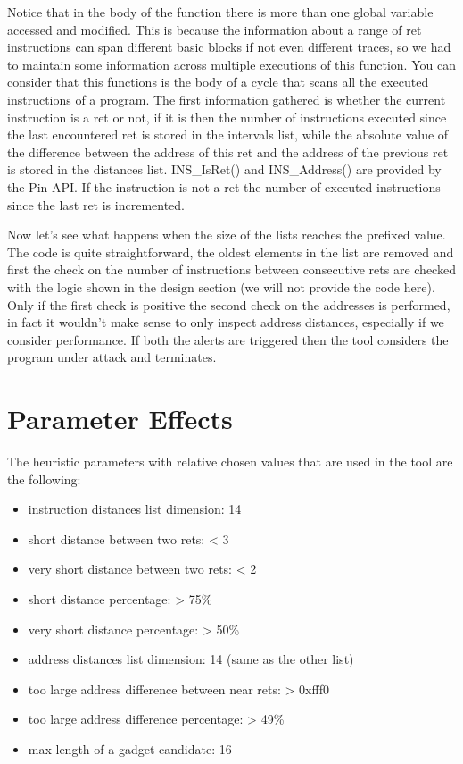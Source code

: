 \documentclass[Lau,binding=0.6cm]{sapthesis}
\begin{document}
Notice that in the body of the function there is more than one global variable accessed and modified. This is because the information about a range of ret instructions can span different basic blocks if not even different traces, so we had to maintain some information across multiple executions of this function. You can consider that this functions is the body of a cycle that scans all the executed instructions of a program. The first information gathered is whether the current instruction is a ret or not, if it is then the number of instructions executed since the last encountered ret is stored in the intervals list, while the absolute value of the difference between the address of this ret and the address of the previous ret is stored in the distances list. INS\_IsRet() and INS\_Address() are provided by the Pin API. If the instruction is not a ret the number of executed instructions since the last ret is incremented.


Now let’s see what happens when the size of the lists reaches the prefixed value. The code is quite straightforward, the oldest elements in the list are removed and first the check on the number of instructions between consecutive rets are checked with the logic shown in the design section (we will not provide the code here). Only if the first check is positive the second check on the addresses is performed, in fact it wouldn’t make sense to only inspect address distances, especially if we consider performance. If both the alerts are triggered then the tool considers the program under attack and terminates.


\section{Parameter Effects}

The heuristic parameters with relative chosen values that are used in the tool are the following:

\begin{itemize}
\item instruction distances list dimension: 14
\item short distance between two rets: < 3
\item very short distance between two rets: < 2
\item short distance percentage: > 75\%
\item very short distance percentage: > 50\%
\item address distances list dimension: 14 (same as the other list)
\item too large address difference between near rets: > 0xfff0
\item too large address difference percentage: > 49\%
\item max length of a gadget candidate: 16
\end{itemize}
\end{document}
